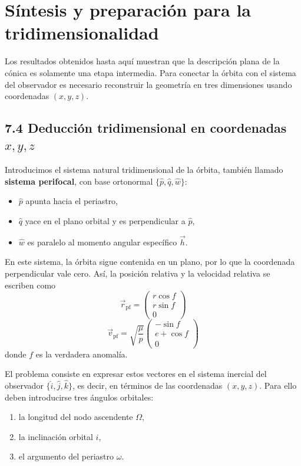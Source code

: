 \section{Síntesis y preparación para la tridimensionalidad}
Los resultados obtenidos hasta aquí muestran que la descripción plana de la cónica es solamente una etapa intermedia. Para conectar la órbita con el sistema del observador es necesario reconstruir la geometría en tres dimensiones usando coordenadas \((x,y,z)\).

\subsection{7.4 Deducción tridimensional en coordenadas \texorpdfstring{$x,y,z$}{x,y,z}}
Introducimos el sistema natural tridimensional de la órbita, también llamado \textbf{sistema perifocal}, con base ortonormal \(\{\hat{p},\hat{q},\hat{w}\}\):
\begin{itemize}
    \item \(\hat{p}\) apunta hacia el periastro,
    \item \(\hat{q}\) yace en el plano orbital y es perpendicular a \(\hat{p}\),
    \item \(\hat{w}\) es paralelo al momento angular específico \(\vec{h}\).
\end{itemize}

En este sistema, la órbita sigue contenida en un plano, por lo que la coordenada perpendicular vale cero. Así, la posición relativa y la velocidad relativa se escriben como
\[
\vec{r}_{\mathrm{pf}} =
\begin{pmatrix}
 r\cos f \\
 r\sin f \\
 0
\end{pmatrix}
\]
\[
\vec{v}_{\mathrm{pf}} =
\sqrt{\frac{\mu}{p}}
\begin{pmatrix}
 -\sin f \\
 e+\cos f \\
 0
\end{pmatrix}
\]
donde \(f\) es la verdadera anomalía.

El problema consiste en expresar estos vectores en el sistema inercial del observador \(\{\hat{i},\hat{j},\hat{k}\}\), es decir, en términos de las coordenadas \((x,y,z)\). Para ello deben introducirse tres ángulos orbitales:
\begin{enumerate}
    \item la longitud del nodo ascendente \(\Omega\),
    \item la inclinación orbital \(i\),
    \item el argumento del periastro \(\omega\).
\end{enumerate}

